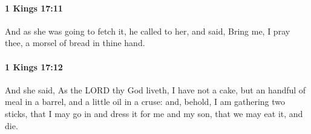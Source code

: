 		\paragraph{1 Kings 17:11} %
			\label{1KINGS-17-11}

			And as she was going to fetch it, he called to her, and said, Bring me, I pray thee, a morsel of bread in thine hand.


		\paragraph{1 Kings 17:12} %
			\label{1KINGS-17-12}

			And she said, As the LORD thy God liveth, I have not a cake, but an handful of meal in a barrel, and a little oil in a cruse: and, behold, I am gathering two sticks, that I may go in and dress it for me and my son, that we may eat it, and die.


